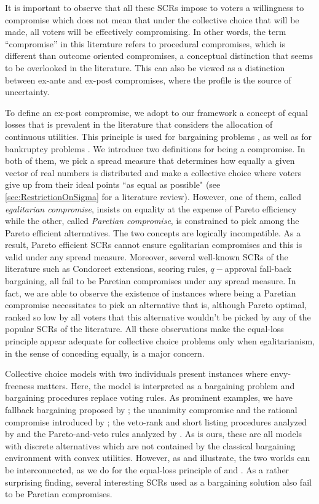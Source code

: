 \documentclass[version=3.21, pagesize, twoside=off, bibliography=totoc, DIV=calc, fontsize=12pt, a4paper]{scrartcl}
\begin{document}
It is important to observe that all these \acp{SCR} impose to voters a willingness to compromise which does not mean that under the collective choice that will be made, all voters will be effectively compromising. In other words, the term “compromise” in this literature refers to procedural compromises, which is different than outcome oriented compromises, a conceptual distinction that seems to be overlooked in the literature.
This can also be viewed as a distinction between ex-ante and ex-post compromises, where the profile is the source of uncertainty.

To define an ex-post compromise, we adopt to our framework a concept of equal losses that is prevalent in the literature that considers the allocation of continuous utilities. This principle is used for bargaining problems \citep{Chun1988}, \citep{Chun1991} as well as for bankruptcy problems \citep{Herrero2001}. 
We introduce two definitions for being a compromise. In both of them, we pick a spread measure that determines how equally a given vector of real numbers is distributed and make a collective choice where voters give up from their ideal points “as equal as possible" (see \cref{sec:RestrictionOnSigma} for a literature review). However, one of them, called \textit{egalitarian compromise}, insists on equality at the expense of Pareto efficiency while the other, called \textit{Paretian compromise}, is constrained to pick among the Pareto efficient alternatives. 
The two concepts are logically incompatible. As a result, Pareto efficient \acp{SCR} cannot ensure egalitarian compromises and this is valid under any spread measure. Moreover, several well-known \acp{SCR} of the literature such as Condorcet extensions, scoring rules, $q-$approval fall-back bargaining, all fail to be Paretian compromises under any spread measure. In fact, we are able to observe the existence of instances where being a Paretian compromise necessitates to pick an alternative that is, although Pareto optimal, ranked so low by all voters that this alternative wouldn't be picked by any of the popular \acp{SCR} of the literature. All these observations make the equal-loss principle appear adequate for collective choice problems only when egalitarianism, in the sense of conceding equally, is a major concern.

Collective choice models with two individuals present instances where envy-freeness matters. Here, the model is interpreted as a bargaining problem and bargaining procedures replace voting rules. As prominent examples, we have fallback bargaining proposed by \citet{Brams2001}; the unanimity compromise and the rational compromise introduced by \citet{Kibris2007}; the veto-rank and short listing procedures analyzed by \citet{Clippel2014} and the Pareto-and-veto rules analyzed by \citet{Laslier2020}. As is ours, these are all models with discrete alternatives which are not contained by the classical \citet{Nash1950} bargaining environment with convex utilities. However, as \citet{Mariotti1998} and \citet{Nagahisa2002} illustrate, the two worlds can be interconnected, as we do for the equal-loss principle of \citet{Chun1988} and \citet{Chun1991}. As a rather surprising finding, several interesting \acp{SCR} used as a bargaining solution also fail to be Paretian compromises.
\end{document}
